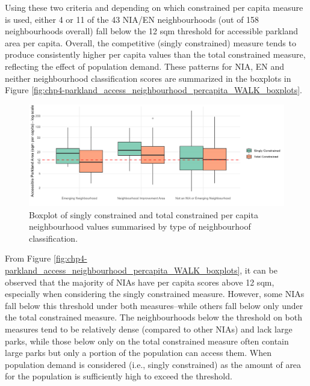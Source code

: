 \documentclass[
11pt, %
oneside, %
english, %
singlespacing, %
]{macthesis} %
\begin{document}
Using these two criteria and depending on which constrained per capita measure is used, either 4 or 11 of the 43 NIA/EN neighbourhoods (out of 158 neighbourhoods overall) fall below the 12 sqm threshold for accessible parkland area per capita. Overall, the competitive (singly constrained) measure tends to produce consistently higher per capita values than the total constrained measure, reflecting the effect of population demand. These patterns for NIA, EN and neither neighbourhood classification scores are summarized in the boxplots in Figure \ref{fig:chp4-parkland_access_neighbourhood_percapita_WALK_boxplots}.

\begin{figure}

{\centering \includegraphics[width=6in]{./data/figures/chp4-parkland_access_neighbourhood_percapita_WALK_boxplots} 

}

\caption{\label{fig:chp4-parkland_access_neighbourhood_percapita_WALK_boxplots} Boxplot of singly constrained and total constrained per capita neighbourhood values summarised by type of neighbourhoof classification. }\label{fig:unnamed-chunk-62}
\end{figure}

From Figure \ref{fig:chp4-parkland_access_neighbourhood_percapita_WALK_boxplots}, it can be observed that the majority of NIAs have per capita scores above 12 sqm, especially when considering the singly constrained measure. However, some NIAs fall below this threshold under both measures--while others fall below only under the total constrained measure. The neighbourhoods below the threshold on both measures tend to be relatively dense (compared to other NIAs) and lack large parks, while those below only on the total constrained measure often contain large parks but only a portion of the population can access them. When population demand is considered (i.e., singly constrained) as the amount of area for the population is sufficiently high to exceed the threshold.
\end{document}

